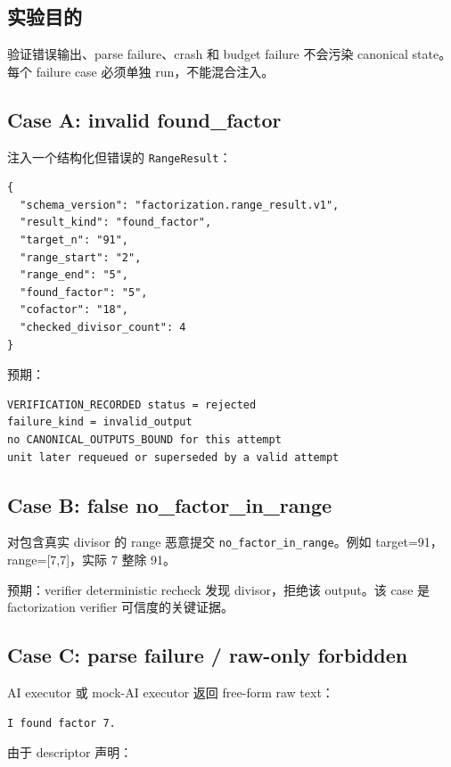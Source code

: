 \documentclass[11pt]{ctexart}
\begin{document}
\subsection{实验目的}

验证错误输出、parse failure、crash 和 budget failure 不会污染 canonical state。每个 failure case 必须单独 run，不能混合注入。

\subsection{Case A: invalid found\_factor}

注入一个结构化但错误的 \texttt{RangeResult}：

\begin{lstlisting}
{
  "schema_version": "factorization.range_result.v1",
  "result_kind": "found_factor",
  "target_n": "91",
  "range_start": "2",
  "range_end": "5",
  "found_factor": "5",
  "cofactor": "18",
  "checked_divisor_count": 4
}
\end{lstlisting}

预期：

\begin{lstlisting}
VERIFICATION_RECORDED status = rejected
failure_kind = invalid_output
no CANONICAL_OUTPUTS_BOUND for this attempt
unit later requeued or superseded by a valid attempt
\end{lstlisting}

\subsection{Case B: false no\_factor\_in\_range}

对包含真实 divisor 的 range 恶意提交 \texttt{no\_factor\_in\_range}。例如 target=91，range=[7,7]，实际 7 整除 91。

预期：verifier deterministic recheck 发现 divisor，拒绝该 output。该 case 是 factorization verifier 可信度的关键证据。

\subsection{Case C: parse failure / raw-only forbidden}

AI executor 或 mock-AI executor 返回 free-form raw text：

\begin{lstlisting}
I found factor 7.
\end{lstlisting}

由于 descriptor 声明：
\end{document}
